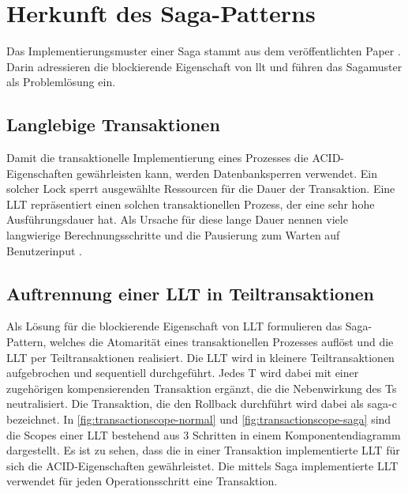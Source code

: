 \section{Herkunft des Saga-Patterns}\label{sec:section-garcia-paper}

Das Implementierungsmuster einer Saga stammt aus dem \citeyear{GarciaMolina.1987} veröffentlichten Paper . Darin adressieren \citeauthor{GarciaMolina.1987} die blockierende Eigenschaft von \acrfull{llt} und führen das Sagamuster als Problemlösung ein. 

\subsection{Langlebige Transaktionen}
Damit die transaktionelle Implementierung eines Prozesses die ACID-Eigenschaften gewährleisten kann, werden Datenbanksperren verwendet. Ein solcher Lock sperrt ausgewählte Ressourcen für die Dauer der Transaktion. Eine LLT repräsentiert einen solchen transaktionellen Prozess, der eine sehr hohe Ausführungsdauer hat. Als Ursache für diese lange Dauer nennen \citeauthor{GarciaMolina.1987} viele langwierige Berechnungsschritte und die Pausierung zum Warten auf Benutzerinput \citep[p.~1]{GarciaMolina.1987}. 

\subsection{Auftrennung einer LLT in Teiltransaktionen}
Als Lösung für die blockierende Eigenschaft von LLT formulieren \citeauthor{GarciaMolina.1987} das Saga-Pattern, welches die Atomarität eines transaktionellen Prozesses auflöst und die LLT per Teiltransaktionen realisiert. Die LLT wird in kleinere Teiltransaktionen aufgebrochen und sequentiell durchgeführt. Jedes T wird dabei mit einer zugehörigen kompensierenden Transaktion ergänzt, die die Nebenwirkung des Ts neutralisiert. Die Transaktion, die den Rollback durchführt wird dabei als \acrfull{saga-c} bezeichnet. In \cref{fig:transactionscope-normal} und \cref{fig:transactionscope-saga} sind die Scopes einer LLT bestehend aus 3 Schritten in einem Komponentendiagramm dargestellt. Es ist zu sehen, dass die in einer Transaktion implementierte LLT für sich die ACID-Eigenschaften gewährleistet. Die mittels Saga implementierte LLT verwendet für jeden Operationsschritt eine Transaktion.


